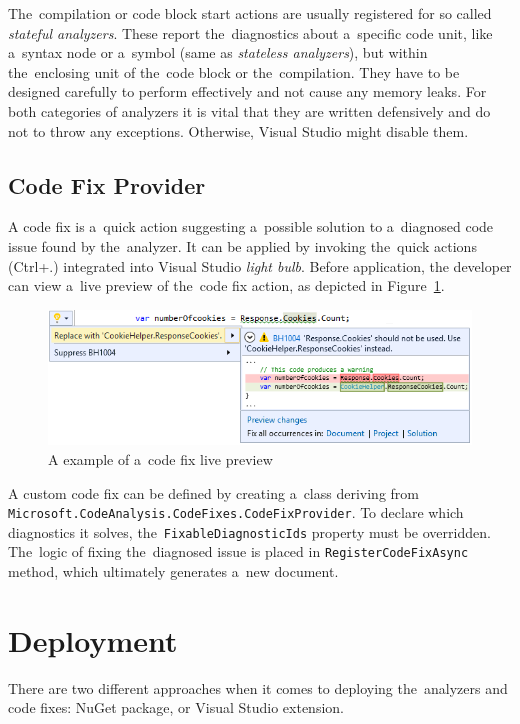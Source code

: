 \documentclass[
  digital, %
  table,   %
  lof,     %
  lot,     %
  oneside,
]{fithesis3}
\begin{document}
The~compilation or code block start actions are usually registered for so called \textit{stateful analyzers}. These report the~diagnostics about a~specific code unit, like a~syntax node or a~symbol (same as \textit{stateless analyzers}), but within the~enclosing unit of the~code block or the~compilation. They have to be designed carefully to perform effectively and not cause any memory leaks. For both categories of analyzers it is vital that they are written defensively and do not to throw any exceptions. Otherwise, Visual Studio might disable them.

\subsection{Code Fix Provider}
A code fix is a~quick action suggesting a~possible solution to a~diagnosed code issue found by the~analyzer. It can be applied by invoking the~quick actions (Ctrl+.) integrated into Visual Studio \textit{light bulb}. Before application, the developer can view a~live preview of the~code fix action, as depicted in Figure~\ref{fig:codefix-example}.

\begin{figure}[h!]
		\centering
			\includegraphics[scale=0.75]{img/codefix-example}
		\caption{A example of a~code fix live preview}
		\label{fig:codefix-example}
\end{figure}

A custom code fix can be defined by creating a~class deriving from \texttt{Microsoft.CodeAnalysis.CodeFixes.CodeFixProvider}. To declare which diagnostics it solves, the~\texttt{FixableDiagnosticIds} property must be overridden. The~logic of fixing the~diagnosed issue is placed in \texttt{RegisterCodeFixAsync} method, which ultimately generates a~new document.

\section{Deployment}
There are two different approaches when it comes to deploying the~analyzers and code fixes: NuGet package, or Visual Studio extension. 
\end{document}
